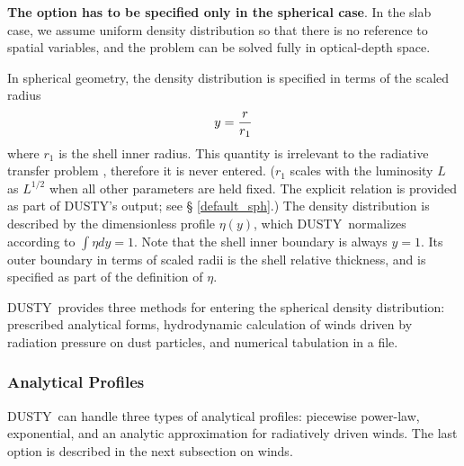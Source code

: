 \documentclass[11pt]{article}
\def\D  {{\sf DUSTY}}
\begin{document}
{\bf The option has to be specified only in the spherical case}. In the slab
case, we assume uniform density distribution so that there is no reference to
spatial variables, and the problem can be solved fully in optical-depth space.

In spherical geometry, the density distribution  is specified in terms of the
scaled radius
\[
                        y = {r \over r_1}
\]
where $r_1$ is the shell inner radius.  This quantity is irrelevant to the
radiative transfer problem \cite{IE97}, therefore it is never entered. ($r_1$
scales with the luminosity $L$ as $L^{1/2}$ when all other parameters are held
fixed. The explicit relation is provided as part of \D's output; see \S
\ref{default_sph}.) The density distribution is described by the dimensionless
profile $\eta(y)$, which \D\ normalizes according to $\int\eta dy = 1$. Note
that the shell inner boundary is always $y = 1$.  Its outer boundary in terms
of scaled radii is the shell relative thickness, and is specified as part of
the definition of $\eta$.

\D\ provides three methods for entering the spherical density distribution:
prescribed analytical forms, hydrodynamic calculation of winds driven by
radiation pressure on dust particles, and numerical tabulation in a file.

\subsubsection{Analytical Profiles}

\D\ can handle three types of analytical profiles: piecewise power-law,
exponential, and an analytic approximation for radiatively driven winds.  The
last option is described in the next subsection on winds.
\end{document}
